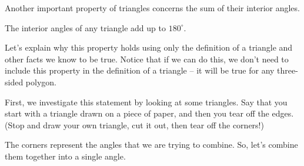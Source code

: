 \documentclass{ximera}
\begin{document}
Another important property of triangles concerns the sum of their interior angles.

\begin{theorem}
The interior angles of any triangle add up to $180^{\circ}$.
\end{theorem}

Let's explain why this property holds using only the definition of a triangle and other facts we know to be true. Notice that if we can do this, we don't need to include this property in the definition of a triangle -- it will be true for any three-sided polygon.

First, we investigate this statement by looking at some triangles. Say that you start with a triangle drawn on a piece of paper, and then you tear off the edges. (Stop and draw your own triangle, cut it out, then tear off the corners!)
\begin{center}

\end{center}

The corners represent the angles that we are trying to combine. So, let's combine them together into a single angle.
\begin{center}
\end{center}
\end{document}
